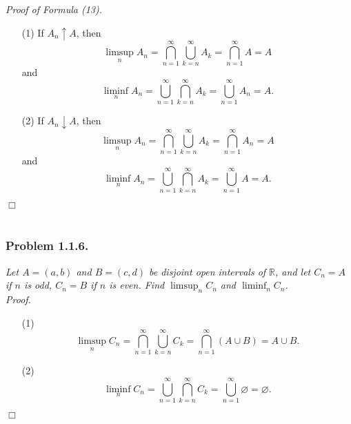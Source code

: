 \documentclass{article}
\begin{document}
\emph{Proof of Formula (13).}
\begin{enumerate}
\item[(1)]
  If $A_n \uparrow A$, then
  \[
    \limsup_{n} A_n
    = \bigcap_{n=1}^{\infty} \bigcup_{k=n}^{\infty} A_k
    = \bigcap_{n=1}^{\infty} A
    = A
  \]
  and
  \[
    \liminf_{n} A_n
    = \bigcup_{n=1}^{\infty} \bigcap_{k=n}^{\infty} A_k
    = \bigcup_{n=1}^{\infty} A_n
    = A.
  \]

\item[(2)]
  If $A_n \downarrow A$, then
  \[
    \limsup_{n} A_n
    = \bigcap_{n=1}^{\infty} \bigcup_{k=n}^{\infty} A_k
    = \bigcap_{n=1}^{\infty} A_n
    = A
  \]
  and
  \[
    \liminf_{n} A_n
    = \bigcup_{n=1}^{\infty} \bigcap_{k=n}^{\infty} A_k
    = \bigcup_{n=1}^{\infty} A
    = A.
  \]
\end{enumerate}
$\Box$ \\\\






\subsubsection*{Problem 1.1.6.}
\emph{Let $A = (a,b)$ and $B = (c,d)$ be disjoint open intervals of $\mathbb{R}$,
and let $C_n = A$ if $n$ is odd, $C_n = B$ if $n$ is even.
Find $\limsup_n C_n$ and $\liminf_n C_n$.} \\



\emph{Proof.}
\begin{enumerate}
\item[(1)]
  \[
    \limsup_{n} C_n
    = \bigcap_{n=1}^{\infty} \bigcup_{k=n}^{\infty} C_k
    = \bigcap_{n=1}^{\infty} ( A \cup B )
    = A \cup B.
  \]

\item[(2)]
  \[
    \liminf_{n} C_n
    = \bigcup_{n=1}^{\infty} \bigcap_{k=n}^{\infty} C_k
    = \bigcup_{n=1}^{\infty} \varnothing
    = \varnothing.
  \]
\end{enumerate}
$\Box$ \\\\



\end{document}
